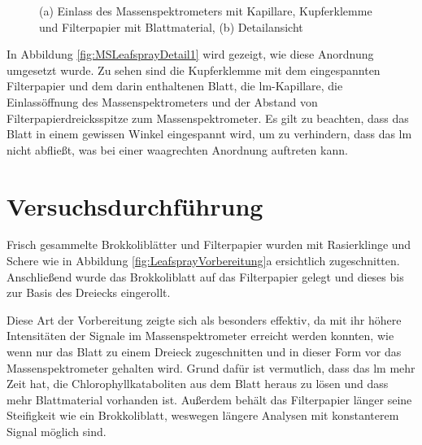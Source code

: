 \begin{figure}[htbp]
\begin{subfigure}[b]{0.5\textwidth}
    \caption{}
    \label{fig:MSLeafsprayDetail2}
  \end{subfigure}
  \label{fig:MSLeafsprayDetail}
  \caption[MS Leafspray Versuchsaufbau Detailfotos, Quelle: Author]{(a) Einlass des Massenspektrometers mit Kapillare, Kupferklemme und Filterpapier mit Blattmaterial, (b) Detailansicht}
\end{figure}

In Abbildung \ref{fig:MSLeafsprayDetail1} wird gezeigt, wie diese Anordnung umgesetzt wurde. Zu sehen sind die Kupferklemme mit dem eingespannten Filterpapier und dem darin enthaltenen Blatt, die \gls{lm}-Kapillare, die Einlassöffnung des Massenspektrometers und der Abstand von Filterpapierdreicksspitze zum Massenspektrometer. Es gilt zu beachten, dass das Blatt in einem gewissen Winkel eingespannt wird, um zu verhindern, dass das \gls{lm} nicht abfließt, was bei einer waagrechten Anordnung auftreten kann. 

\section{Versuchsdurchführung} \label{sec:Versuchsdurchfuehrung}

Frisch gesammelte Brokkoliblätter und Filterpapier wurden mit Rasierklinge und Schere wie in Abbildung \ref{fig:LeafsprayVorbereitung}a ersichtlich zugeschnitten. Anschließend wurde das Brokkoliblatt auf das Filterpapier gelegt und dieses bis zur Basis des Dreiecks eingerollt. 

Diese Art der Vorbereitung zeigte sich als besonders effektiv, da mit ihr höhere Intensitäten der Signale im Massenspektrometer erreicht werden konnten, wie wenn nur das Blatt zu einem Dreieck zugeschnitten und in dieser Form vor das Massenspektrometer gehalten wird. Grund dafür ist vermutlich, dass das \gls{lm} mehr Zeit hat, die Chlorophyllkataboliten aus dem Blatt heraus zu lösen und dass mehr Blattmaterial vorhanden ist. Außerdem behält das Filterpapier länger seine Steifigkeit wie ein Brokkoliblatt, weswegen längere Analysen mit konstanterem Signal möglich sind.

